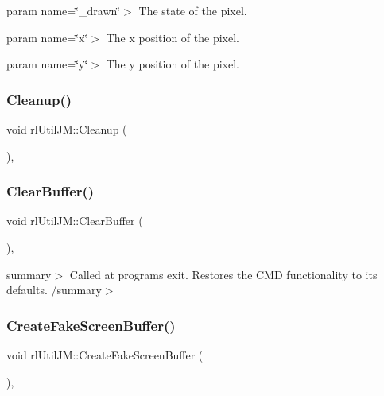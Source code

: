 param name=\char`\"{}\+\_\+drawn\char`\"{}$>$ The state of the pixel.

param name=\char`\"{}x\char`\"{}$>$ The x position of the pixel.

param name=\char`\"{}y\char`\"{}$>$ The y position of the pixel.\mbox{\label{classrl_util_j_m_a6981baa969d95022e67aeeff1d38deda}} 
\subsubsection{\texorpdfstring{Cleanup()}{Cleanup()}}
{\footnotesize\ttfamily void rl\+Util\+J\+M\+::\+Cleanup (\begin{DoxyParamCaption}{ }\end{DoxyParamCaption})\hspace{0.3cm}{\ttfamily [static]}, {\ttfamily [protected]}}

\mbox{\label{classrl_util_j_m_aa7d02be670eaf0a8ac3d97a71f85cd8c}} 
\subsubsection{\texorpdfstring{Clear\+Buffer()}{ClearBuffer()}}
{\footnotesize\ttfamily void rl\+Util\+J\+M\+::\+Clear\+Buffer (\begin{DoxyParamCaption}{ }\end{DoxyParamCaption})\hspace{0.3cm}{\ttfamily [static]}, {\ttfamily [protected]}}

summary$>$ Called at program\textquotesingle{}s exit. Restores the C\+MD functionality to its defaults. /summary$>$ \mbox{\label{classrl_util_j_m_a89821abf41757212f1a4f046b734d45b}} 
\subsubsection{\texorpdfstring{Create\+Fake\+Screen\+Buffer()}{CreateFakeScreenBuffer()}}
{\footnotesize\ttfamily void rl\+Util\+J\+M\+::\+Create\+Fake\+Screen\+Buffer (\begin{DoxyParamCaption}{ }\end{DoxyParamCaption})\hspace{0.3cm}{\ttfamily [static]}, {\ttfamily [private]}}

